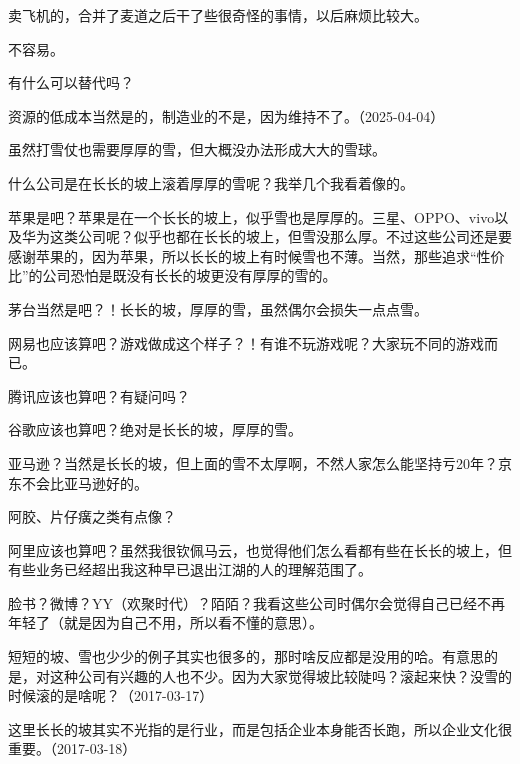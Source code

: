 
卖飞机的，合并了麦道之后干了些很奇怪的事情，以后麻烦比较大。


不容易。


有什么可以替代吗？


资源的低成本当然是的，制造业的不是，因为维持不了。（2025-04-04）

虽然打雪仗也需要厚厚的雪，但大概没办法形成大大的雪球。

什么公司是在长长的坡上滚着厚厚的雪呢？我举几个我看着像的。

苹果是吧？苹果是在一个长长的坡上，似乎雪也是厚厚的。三星、OPPO、vivo以及华为这类公司呢？似乎也都在长长的坡上，但雪没那么厚。不过这些公司还是要感谢苹果的，因为苹果，所以长长的坡上有时候雪也不薄。当然，那些追求“性价比”的公司恐怕是既没有长长的坡更没有厚厚的雪的。

茅台当然是吧？！长长的坡，厚厚的雪，虽然偶尔会损失一点点雪。

网易也应该算吧？游戏做成这个样子？！有谁不玩游戏呢？大家玩不同的游戏而已。

腾讯应该也算吧？有疑问吗？

谷歌应该也算吧？绝对是长长的坡，厚厚的雪。

亚马逊？当然是长长的坡，但上面的雪不太厚啊，不然人家怎么能坚持亏20年？京东不会比亚马逊好的。

阿胶、片仔癀之类有点像？

阿里应该也算吧？虽然我很钦佩马云，也觉得他们怎么看都有些在长长的坡上，但有些业务已经超出我这种早已退出江湖的人的理解范围了。

脸书？微博？YY（欢聚时代）？陌陌？我看这些公司时偶尔会觉得自己已经不再年轻了（就是因为自己不用，所以看不懂的意思）。

短短的坡、雪也少少的例子其实也很多的，那时啥反应都是没用的哈。有意思的是，对这种公司有兴趣的人也不少。因为大家觉得坡比较陡吗？滚起来快？没雪的时候滚的是啥呢？（2017-03-17）

这里长长的坡其实不光指的是行业，而是包括企业本身能否长跑，所以企业文化很重要。（2017-03-18）
